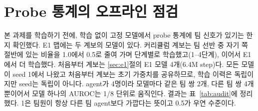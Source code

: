 \documentclass[twocolumn,10pt]{article}
\theoremstyle{remark}
\newcommand{\ours}{PGCT}
\begin{document}
\section{Probe 통계의 오프라인 점검}
\label{sec:audit}
본 과제를 학습하기 전에, 학습 없이 고정 모델에서 probe 통계에 팀 신호가 있기는 한지 확인했다. E1 맵에는 두 계보의 모델이 있다.
커리큘럼 계보는 팀 선반 중 자기 쪽 절반에 있는 비율을 1.0에서 0.5로 줄여 가며 단계별로 학습했고(1--4단계), 이어서 E1에서 더
학습했다. 처음부터 계보는 \ref{sec:e1}절의 E1 모델 4개(6.4M step)다. 모든 모델이 seed 1에서 나왔고 처음부터 계보는 초기
가중치를 공유하므로, 학습 이력은 독립이지만 seed는 독립이 아니다. agent가 4명이라 모델마다 같은 팀 쌍 2개, 다른 팀 쌍 4개뿐이어서
모델 하나의 AUROC는 1/8 단위로 움직인다. 결과는 표~\ref{tab:audit}에 정리했다. 1은 팀원이 항상 다른 팀 agent보다 가깝다는 뜻이고
0.5가 우연 수준이다.

\begin{table}[t]
\centering
\small
{}
\caption{고정된 E1 맵 모델에서 probe 통계의 같은 팀 AUROC(seed 1). 1행: 모델 간 범위, 2행: 평균, 창 행: 모델 평균의 두 창 생성
정책 간 범위. 칸마다 모델 2--6개(부록~\ref{app:audit}). $Q_{\mathrm{diff}}$: 실제 보상이 팀마다 다른 질의, $Q_{\mathrm{same}}$:
나머지. $^{a}$in-sample: 이 모델들을 본 뒤 규칙을 정했다. $^{b}$관측자가 자기 목표를 기준으로 이웃의 pickup·배송을 센 것으로,
\ours{}가 교환하지 않는 정보를 쓴다.}
\label{tab:audit}
\end{table}
\end{document}
